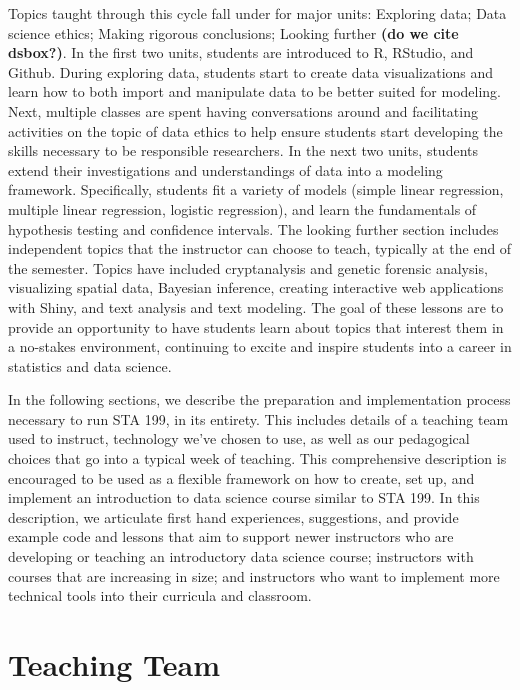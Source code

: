 \documentclass[
  12pt]{article}
\begin{document}
Topics taught through this cycle fall under for major units: Exploring
data; Data science ethics; Making rigorous conclusions; Looking further
\textbf{(do we cite dsbox?)}. In the first two units, students are
introduced to R, RStudio, and Github. During exploring data, students
start to create data visualizations and learn how to both import and
manipulate data to be better suited for modeling. Next, multiple classes
are spent having conversations around and facilitating activities on the
topic of data ethics to help ensure students start developing the skills
necessary to be responsible researchers. In the next two units, students
extend their investigations and understandings of data into a modeling
framework. Specifically, students fit a variety of models (simple linear
regression, multiple linear regression, logistic regression), and learn
the fundamentals of hypothesis testing and confidence intervals. The
looking further section includes independent topics that the instructor
can choose to teach, typically at the end of the semester. Topics have
included cryptanalysis and genetic forensic analysis, visualizing
spatial data, Bayesian inference, creating interactive web applications
with Shiny, and text analysis and text modeling. The goal of these
lessons are to provide an opportunity to have students learn about
topics that interest them in a no-stakes environment, continuing to
excite and inspire students into a career in statistics and data
science.

In the following sections, we describe the preparation and
implementation process necessary to run STA 199, in its entirety. This
includes details of a teaching team used to instruct, technology we've
chosen to use, as well as our pedagogical choices that go into a typical
week of teaching. This comprehensive description is encouraged to be
used as a flexible framework on how to create, set up, and implement an
introduction to data science course similar to STA 199. In this
description, we articulate first hand experiences, suggestions, and
provide example code and lessons that aim to support newer instructors
who are developing or teaching an introductory data science course;
instructors with courses that are increasing in size; and instructors
who want to implement more technical tools into their curricula and
classroom.

\hypertarget{teaching-team}{%
\section{Teaching Team}\label{teaching-team}}
\end{document}
